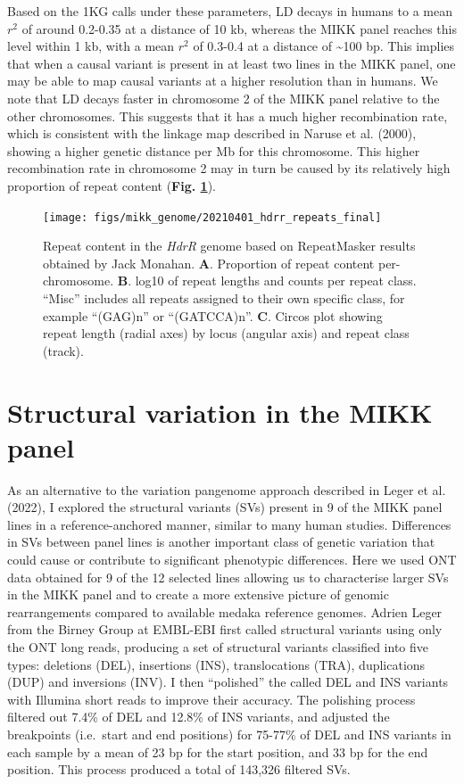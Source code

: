 \documentclass[
]{book}
\begin{document}
Based on the 1KG calls under these parameters, LD decays in humans to a mean \(r^2\) of around 0.2-0.35 at a distance of 10 kb, whereas the MIKK panel reaches this level within 1 kb, with a mean \(r^2\) of 0.3-0.4 at a distance of \textasciitilde100 bp. This implies that when a causal variant is present in at least two lines in the MIKK panel, one may be able to map causal variants at a higher resolution than in humans. We note that LD decays faster in chromosome 2 of the MIKK panel relative to the other chromosomes. This suggests that it has a much higher recombination rate, which is consistent with the linkage map described in Naruse et al. (2000), showing a higher genetic distance per Mb for this chromosome. This higher recombination rate in chromosome 2 may in turn be caused by its relatively high proportion of repeat content (\textbf{Fig. \ref{fig:repeats}}).



\begin{figure}
\texttt{[image: figs/mikk\_genome/20210401\_hdrr\_repeats\_final]} \caption{Repeat content in the \emph{HdrR} genome based on RepeatMasker results obtained by Jack Monahan. \textbf{A}. Proportion of repeat content per-chromosome. \textbf{B}. log10 of repeat lengths and counts per repeat class. ``Misc'' includes all repeats assigned to their own specific class, for example ``(GAG)n'' or ``(GATCCA)n''. \textbf{C}. Circos plot showing repeat length (radial axes) by locus (angular axis) and repeat class (track).}\label{fig:repeats}
\end{figure}

\hypertarget{mikksv-sec}{%
\section{Structural variation in the MIKK panel}\label{mikksv-sec}}

As an alternative to the variation pangenome approach described in Leger et al. (2022), I explored the structural variants (SVs) present in 9 of the MIKK panel lines in a reference-anchored manner, similar to many human studies. Differences in SVs between panel lines is another important class of genetic variation that could cause or contribute to significant phenotypic differences. Here we used ONT data obtained for 9 of the 12 selected lines allowing us to characterise larger SVs in the MIKK panel and to create a more extensive picture of genomic rearrangements compared to available medaka reference genomes. Adrien Leger from the Birney Group at EMBL-EBI first called structural variants using only the ONT long reads, producing a set of structural variants classified into five types: deletions (DEL), insertions (INS), translocations (TRA), duplications (DUP) and inversions (INV). I then ``polished'' the called DEL and INS variants with Illumina short reads to improve their accuracy. The polishing process filtered out 7.4\% of DEL and 12.8\% of INS variants, and adjusted the breakpoints (i.e.~start and end positions) for 75-77\% of DEL and INS variants in each sample by a mean of 23 bp for the start position, and 33 bp for the end position. This process produced a total of 143,326 filtered SVs.
\end{document}
